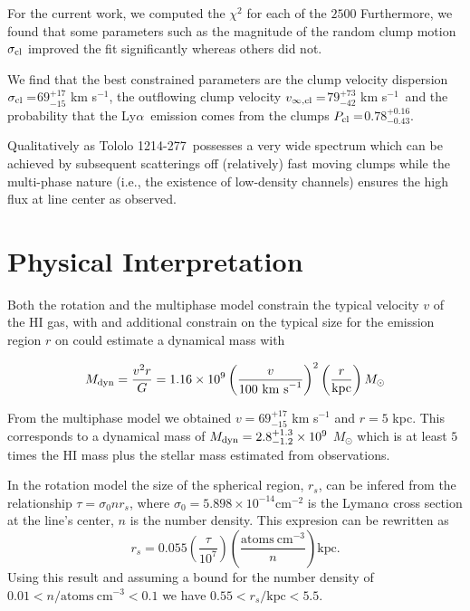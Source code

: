 \documentclass[a4paper, usenatbib, 12pt]{article}
\newcommand{\tol}{Tololo 1214-277}
\newcommand{\lya}{Ly$\alpha$}
\newcommand{\sigmaclump}{$69^{+17}_{-15}$ km s$^{-1}$}
\newcommand{\inftyclump}{$79^{+73}_{-42}$ km s$^{-1}$}
\newcommand{\probaclump}{$0.78^{+0.16}_{-0.43}$}
\begin{document}
{For the current work, we computed the $\chi^2$ for each of the $2500$
Furthermore, we found that some parameters such as the magnitude of
the random clump motion $\sigma_{\rm cl}$ improved the fit
significantly whereas others did not.  

We find that the best constrained parameters are the clump velocity
dispersion $\sigma_{\rm cl}=$\sigmaclump,  the outflowing clump
velocity $v_{\infty {\rm, cl}}=$\inftyclump\ and the probability that
the \lya\ emission comes from the clumps $P_{\rm cl}=$\probaclump.

Qualitatively as \tol\ possesses a very wide spectrum which can be
achieved by subsequent scatterings off (relatively) fast moving clumps
while the multi-phase nature (i.e., the existence of low-density
channels) ensures the high flux at line center as observed.     


\section*{Physical Interpretation}

Both the rotation and the multiphase model constrain the typical
velocity $v$ of the HI gas, with and additional constrain on the typical
size for the emission region $r$ on could estimate a dynamical mass with 

\begin{equation}
M_{\rm dyn} = \frac{v^{2}r}{G} = 1.16\times10^{9}
\left(\frac{v}{100\ \mathrm{km\ s}^{-1}}\right)^2\left(\frac{r}{\mathrm{kpc}}\right) M_{\odot}
\end{equation}

From the multiphase model we obtained $v=$\sigmaclump
and $r=5$ kpc. This corresponds to a dynamical mass of $M_{\rm
  dyn}=2.8^{+1.3}_{-1.2}\times 10^{9}$ $M_{\odot}$ which is at least
$5$ times the HI mass plus the stellar mass estimated from
observations.   

In the rotation model the size of the spherical region, $r_{s}$, can
be infered from the relationship $\tau = \sigma_0 n r_s$, where
$\sigma_0=5.898\times 10^{-14}$cm$^{-2}$ is the Lyman$\alpha$
cross section at the  line's center, $n$ is the number density. 
This expresion can be rewritten as
\begin{equation}
r_{s} = 0.055 \left(\frac{\tau}{10^7}\right) \left(
\frac{\mathrm{atoms\ cm^{-3}}}{n}\right) \mathrm{kpc}.
\end{equation}
%
Using this result and assuming a bound for the number density of
$0.01<n/\mathrm{atoms\ cm^{-3}}<0.1$ we have $0.55
< r_s/\mathrm{kpc}<5.5$.

}
\end{document}

